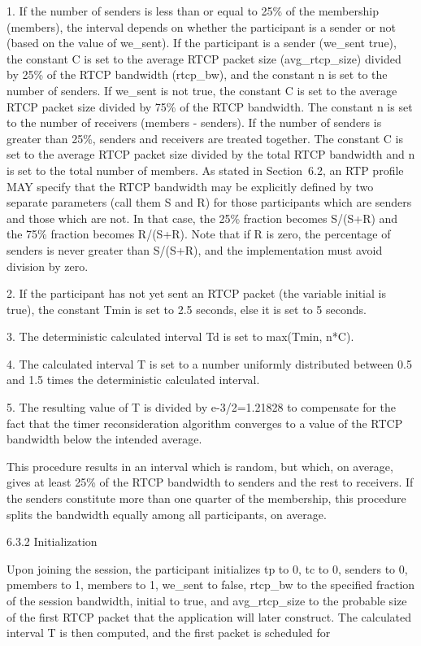 \documentclass{article}
\begin{document}
1. If the number of senders is less than or equal to 25\% of the membership (members), the interval depends on whether the participant is a sender or not (based on the value of we\_sent). If the participant is a sender (we\_sent true), the constant C is set to the average RTCP packet size (avg\_rtcp\_size) divided by 25\% of the RTCP bandwidth (rtcp\_bw), and the constant n is set to the number of senders.  If we\_sent is not true, the constant C is set to the average RTCP packet size divided by 75\% of the RTCP bandwidth.  The constant n is set to the number of receivers (members - senders).  If the number of senders is greater than 25\%, senders and receivers are treated together.  The constant C is set to the average RTCP packet size divided by the total RTCP bandwidth and n is set to the total number of members.  As stated in Section~6.2, an RTP profile MAY specify that the RTCP bandwidth may be explicitly defined by two separate parameters (call them S and R) for those participants which are senders and those which are not.  In that case, the 25\% fraction becomes S/(S+R) and the 75\% fraction becomes R/(S+R).  Note that if R is zero, the percentage of senders is never greater than S/(S+R), and the implementation must avoid division by zero.

2. If the participant has not yet sent an RTCP packet (the variable initial is true), the constant Tmin is set to 2.5 seconds, else it is set to 5 seconds.

3. The deterministic calculated interval Td is set to max(Tmin, n*C).

4. The calculated interval T is set to a number uniformly distributed between 0.5 and 1.5 times the deterministic calculated interval.

5. The resulting value of T is divided by e-3/2=1.21828 to compensate for the fact that the timer reconsideration algorithm converges to a value of the RTCP bandwidth below the intended average.

This procedure results in an interval which is random, but which, on average, gives at least 25\% of the RTCP bandwidth to senders and the rest to receivers.  If the senders constitute more than one quarter of the membership, this procedure splits the bandwidth equally among all participants, on average.

6.3.2 Initialization

Upon joining the session, the participant initializes tp to 0, tc to 0, senders to 0, pmembers to 1, members to 1, we\_sent to false, rtcp\_bw to the specified fraction of the session bandwidth, initial to true, and avg\_rtcp\_size to the probable size of the first RTCP packet that the application will later construct.  The calculated interval T is then computed, and the first packet is scheduled for
\end{document}
